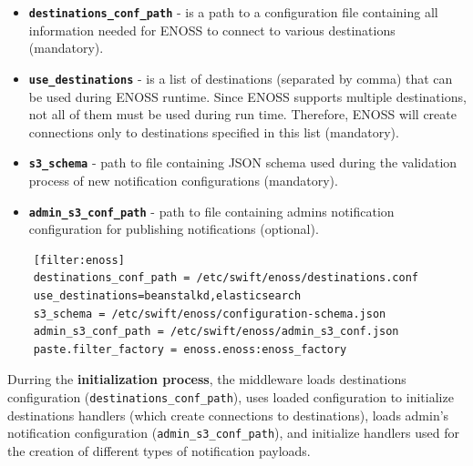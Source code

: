     \begin{itemize}
        \item \textbf{\texttt{destinations\_conf\_path}} - is a path to a configuration file containing all information needed for ENOSS to connect to various destinations (mandatory).
        \item \textbf{\texttt{use\_destinations}} - is a list of destinations (separated by comma) that can be used during ENOSS runtime. Since ENOSS supports multiple destinations, not all of them must be used during run time. Therefore, ENOSS will create connections only to destinations specified in this list (mandatory).
        \item \textbf{\texttt{s3\_schema}} - path to file containing JSON schema used during the validation process of new notification configurations (mandatory).
        \item \textbf{\texttt{admin\_s3\_conf\_path}} - path to file containing admins notification configuration for publishing notifications (optional).
    \end{itemize}

    \lstset{
        caption=Example ENOSS middleware configuration stored in the Proxy server configuration (proxy-server.conf).,
        label=lst:middlewareConfig
    }
    \begin{lstlisting}
    [filter:enoss]
    destinations_conf_path = /etc/swift/enoss/destinations.conf
    use_destinations=beanstalkd,elasticsearch
    s3_schema = /etc/swift/enoss/configuration-schema.json
    admin_s3_conf_path = /etc/swift/enoss/admin_s3_conf.json
    paste.filter_factory = enoss.enoss:enoss_factory
    \end{lstlisting}

    Durring the \textbf{initialization process}, the middleware loads destinations configuration (\texttt{destinations\_conf\_path}), uses loaded configuration to initialize destinations handlers (which create connections to destinations), loads admin's notification configuration (\texttt{admin\_s3\_conf\_path}), and initialize handlers used for the creation of different types of notification payloads.

